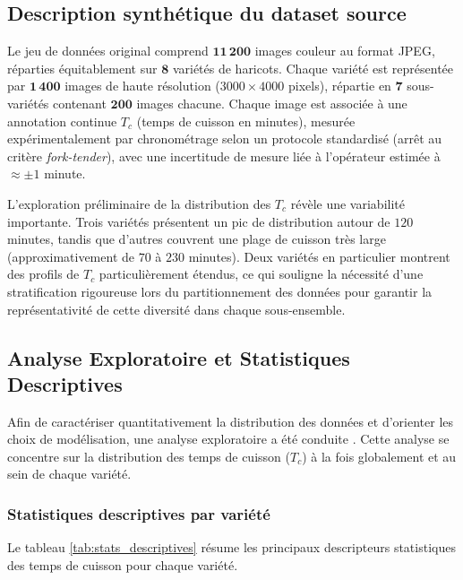 \subsection{Description synthétique du dataset source}

Le jeu de données original comprend \(\mathbf{11\,200}\) images couleur au format JPEG, réparties équitablement sur \(\mathbf{8}\) variétés de haricots. Chaque variété est représentée par \(\mathbf{1\,400}\) images de haute résolution (\(3000\times4000\) pixels), répartie en \(\mathbf{7}\) sous-variétés contenant \(\mathbf{200}\) images chacune. Chaque image est associée à une annotation continue \(T_c\) (temps de cuisson en minutes), mesurée expérimentalement par chronométrage selon un protocole standardisé (arrêt au critère \emph{fork-tender}), avec une incertitude de mesure liée à l'opérateur estimée à \(\approx\pm 1\) minute.

L’exploration préliminaire de la distribution des $T_c$ révèle une variabilité importante. Trois variétés présentent un pic de distribution autour de $120$ minutes, tandis que d'autres couvrent une plage de cuisson très large (approximativement de $70$ à $230$ minutes). Deux variétés en particulier montrent des profils de $T_c$ particulièrement étendus, ce qui souligne la nécessité d'une stratification rigoureuse lors du partitionnement des données pour garantir la représentativité de cette diversité dans chaque sous-ensemble.

\subsection{Analyse Exploratoire et Statistiques Descriptives}

Afin de caractériser quantitativement la distribution des données et d'orienter les choix de modélisation, une analyse exploratoire a été conduite \autocite{tukey1977exploratory}. Cette analyse se concentre sur la distribution des temps de cuisson ($T_c$) à la fois globalement et au sein de chaque variété.

\subsubsection{Statistiques descriptives par variété}

Le tableau \ref{tab:stats_descriptives} résume les principaux descripteurs statistiques des temps de cuisson pour chaque variété.

